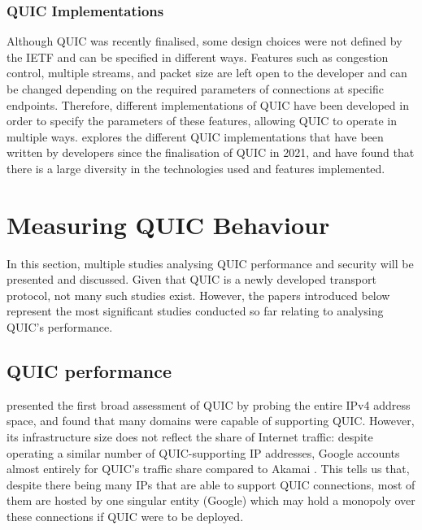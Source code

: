 \documentclass{l4proj}
\begin{document}
\subsubsection{QUIC Implementations} Although QUIC was recently finalised, some design choices were not defined by the IETF and can be specified in different ways. Features such as congestion control, multiple streams, and packet size are left open to the developer and can be changed depending on the required parameters of connections at specific endpoints. Therefore, different implementations of QUIC have been developed in order to specify the parameters of these features, allowing QUIC to operate in multiple ways. \citet{Hertel2022} explores the different QUIC implementations that have been written by developers since the finalisation of QUIC in 2021, and have found that there is a large diversity in the technologies used and features implemented.

\section{Measuring QUIC Behaviour}

In this section, multiple studies analysing QUIC performance and security will be presented and discussed. Given that QUIC is a newly developed transport protocol, not many such studies exist. However, the papers introduced below represent the most significant studies conducted so far relating to analysing QUIC's performance.

\subsection{QUIC performance}

\cite{Ruth2018}  presented the first broad assessment of QUIC by probing the entire IPv4 address space, and found that many domains were capable of supporting QUIC. However, its infrastructure size does not reflect the share of Internet traffic: despite operating a similar number of QUIC-supporting IP addresses, Google accounts almost entirely for QUIC's traffic share compared to Akamai \citep{Ruth2018} . This tells us that, despite there being many IPs that are able to support QUIC connections, most of them are hosted by one singular entity (Google) which may hold a monopoly over these connections if QUIC were to be deployed. 
\end{document}
